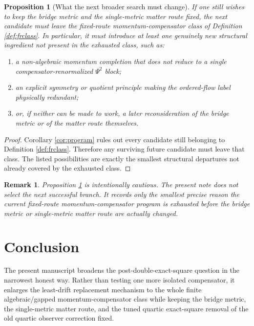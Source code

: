 \documentclass[11pt]{article}
\newtheorem{proposition}{Proposition}
\newtheorem{remark}{Remark}
\begin{document}
\begin{proposition}[What the next broader search must change]
\label{prop:next}
If one still wishes to keep the bridge metric and the single-metric matter route fixed, the next candidate must leave the fixed-route momentum-compensator class of Definition \ref{def:frclass}. In particular, it must introduce at least one genuinely new structural ingredient not present in the exhausted class, such as:
\begin{enumerate}
    \item a non-algebraic momentum completion that does not reduce to a single compensator-renormalized \(\Psi^2\) block;
    \item an explicit symmetry or quotient principle making the ordered-flow label physically redundant;
    \item or, if neither can be made to work, a later reconsideration of the bridge metric or of the matter route themselves.
\end{enumerate}
\end{proposition}

\begin{proof}
Corollary \ref{cor:program} rules out every candidate still belonging to Definition \ref{def:frclass}. Therefore any surviving future candidate must leave that class. The listed possibilities are exactly the smallest structural departures not already covered by the exhausted class.
\end{proof}

\begin{remark}
Proposition \ref{prop:next} is intentionally cautious. The present note does not select the next successful branch. It records only the smallest precise reason the current fixed-route momentum-compensator program is exhausted before the bridge metric or single-metric matter route are actually changed.
\end{remark}

\section{Conclusion}

The present manuscript broadens the post-double-exact-square question in the narrowest honest way. Rather than testing one more isolated compensator, it enlarges the least-drift replacement mechanism to the whole finite algebraic/gapped momentum-compensator class while keeping the bridge metric, the single-metric matter route, and the tuned quartic exact-square removal of the old quartic observer correction fixed.
\end{document}
